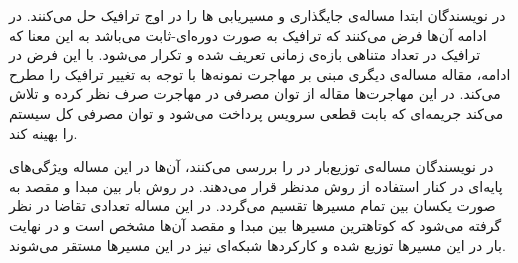 در \cite{Eramo2017}
نویسندگان ابتدا مساله‌ی جایگذاری و مسیریابی ها را
در اوج ترافیک حل می‌کنند. در ادامه آن‌ها فرض می‌کنند که ترافیک به صورت دوره‌ای-ثابت می‌باشد
به این معنا که ترافیک در تعداد متناهی بازه‌ی زمانی تعریف شده و تکرار می‌شود.
با این فرض در ادامه، مقاله مساله‌ی دیگری مبنی بر مهاجرت نمونه‌ها با توجه به تغییر ترافیک را مطرح می‌کند.
در این مهاجرت‌ها مقاله از توان مصرفی در مهاجرت صرف نظر کرده و تلاش می‌کند جریمه‌ای که بابت قطعی سرویس پرداخت می‌شود
و توان مصرفی کل سیستم را بهینه کند.

در \cite{Pham2017}
نویسندگان مساله‌ی توزیع‌بار در  را بررسی می‌کنند،
آن‌ها در این مساله ویژگی‌های پایه‌ای  در کنار استفاده از
روش  مدنظر قرار می‌دهند.
در روش  بار بین مبدا و مقصد
به صورت یکسان بین تمام مسیرها تقسیم می‌گردد.
در این مساله تعدادی تقاضا در نظر گرفته می‌شود که کوتاهترین مسیرها بین مبدا و مقصد آن‌ها مشخص است
و در نهایت بار در این مسیرها توزیع شده و کارکردها شبکه‌ای نیز در این مسیرها مستقر می‌شوند.

